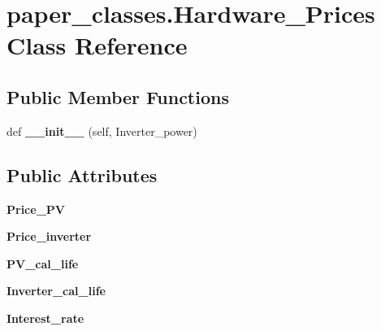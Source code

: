 \hypertarget{classpaper__classes_1_1_hardware___prices}{}\section{paper\+\_\+classes.\+Hardware\+\_\+\+Prices Class Reference}
\label{classpaper__classes_1_1_hardware___prices}
\subsection*{Public Member Functions}
\begin{DoxyCompactItemize}
\item 
\mbox{\label{classpaper__classes_1_1_hardware___prices_a91c8af4f660dbd266d1be614ec21cdf8}} 
def {\bfseries \+\_\+\+\_\+init\+\_\+\+\_\+} (self, Inverter\+\_\+power)
\end{DoxyCompactItemize}
\subsection*{Public Attributes}
\begin{DoxyCompactItemize}
\item 
\mbox{\label{classpaper__classes_1_1_hardware___prices_a256da5350e18fc6c34f4049972a385a5}} 
{\bfseries Price\+\_\+\+PV}
\item 
\mbox{\label{classpaper__classes_1_1_hardware___prices_aa86c48156dc1d32807f571f7df31b0cc}} 
{\bfseries Price\+\_\+inverter}
\item 
\mbox{\label{classpaper__classes_1_1_hardware___prices_ae7e990bbd02b071efff8808028207561}} 
{\bfseries P\+V\+\_\+cal\+\_\+life}
\item 
\mbox{\label{classpaper__classes_1_1_hardware___prices_a24d8d1641ed4fc30a7d65a24c60ad538}} 
{\bfseries Inverter\+\_\+cal\+\_\+life}
\item 
\mbox{\label{classpaper__classes_1_1_hardware___prices_a908b8a99060a2ebba7ce45390bb67800}} 
{\bfseries Interest\+\_\+rate}
\end{DoxyCompactItemize}



